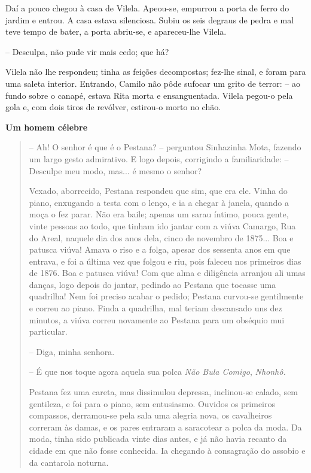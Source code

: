 Daí a pouco chegou à casa de Vilela. Apeou-se, empurrou a porta de ferro
do jardim e entrou. A casa estava silenciosa. Subiu os seis degraus de
pedra e mal teve tempo de bater, a porta abriu-se, e apareceu-lhe
Vilela.

-- Desculpa, não pude vir mais cedo; que há?

Vilela não lhe respondeu; tinha as feições decompostas; fez-lhe sinal, e
foram para uma saleta interior. Entrando, Camilo não pôde sufocar um
grito de terror: -- ao fundo sobre o canapé, estava Rita morta e
ensanguentada. Vilela pegou-o pela gola e, com dois tiros de revólver,
estirou-o morto no chão.

\textbf{Um homem célebre}

\begin{quote}
-- Ah! O senhor é que é o Pestana? -- perguntou Sinhazinha Mota, fazendo
um largo gesto admirativo. E logo depois, corrigindo a familiaridade: --
Desculpe meu modo, mas... é mesmo o senhor?

Vexado, aborrecido, Pestana respondeu que sim, que era ele. Vinha do
piano, enxugando a testa com o lenço, e ia a chegar à janela, quando a
moça o fez parar. Não era baile; apenas um sarau íntimo, pouca gente,
vinte pessoas ao todo, que tinham ido jantar com a viúva Camargo, Rua do
Areal, naquele dia dos anos dela, cinco de novembro de 1875... Boa e
patusca viúva! Amava o riso e a folga, apesar dos sessenta anos em que
entrava, e foi a última vez que folgou e riu, pois faleceu nos primeiros
dias de 1876. Boa e patusca viúva! Com que alma e diligência arranjou
ali umas danças, logo depois do jantar, pedindo ao Pestana que tocasse
uma quadrilha! Nem foi preciso acabar o pedido; Pestana curvou-se
gentilmente e correu ao piano. Finda a quadrilha, mal teriam descansado
uns dez minutos, a viúva correu novamente ao Pestana para um obséquio
mui particular.

-- Diga, minha senhora.

-- É que nos toque agora aquela sua polca \emph{Não Bula Comigo},
\emph{Nhonhô.}

Pestana fez uma careta, mas dissimulou depressa, inclinou-se calado, sem
gentileza, e foi para o piano, sem entusiasmo. Ouvidos os primeiros
compassos, derramou-se pela sala uma alegria nova, os cavalheiros
correram às damas, e os pares entraram a saracotear a polca da moda. Da
moda, tinha sido publicada vinte dias antes, e já não havia recanto da
cidade em que não fosse conhecida. Ia chegando à consagração do assobio
e da cantarola noturna.


\end{quote}
